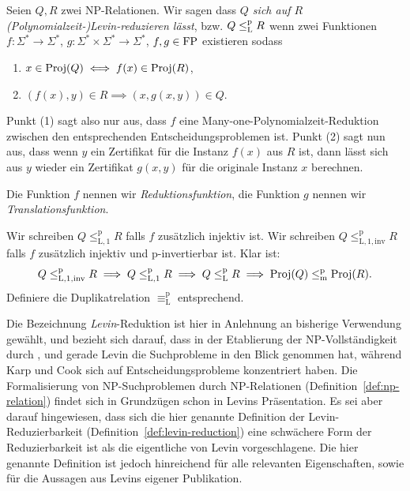 \begin{definition}\label{def:levin-reduction}
    Seien $Q, R$ zwei NP-Relationen. Wir sagen dass \emph{$Q$ sich auf $R$ (Polynomialzeit-)Levin-reduzieren lässt}, bzw. $Q\leq_\mathrm{L}^\mathrm{p} R$ wenn zwei Funktionen $f:\Sigma^*\to\Sigma^*$, $g:\Sigma^*\times\Sigma^*\to\Sigma^*$, $f, g\in \mathrm{FP}$ existieren sodass
    \begin{enumerate}
        \item $x\in\operatorname{Proj}(Q) \iff f(x)\in\operatorname{Proj}(R)$,
        \item $(f(x), y)\in R \implies (x, g(x,y))\in Q$.
    \end{enumerate}
    Punkt (1) sagt also nur aus, dass $f$ eine Many-one-Polynomialzeit-Reduktion zwischen den entsprechenden Entscheidungsproblemen ist.
    Punkt (2) sagt nun aus, dass wenn $y$ ein Zertifikat für die Instanz $f(x)$ aus $R$ ist, dann lässt sich aus $y$ wieder ein Zertifikat $g(x,y)$ für die originale Instanz $x$ berechnen.

    Die Funktion $f$ nennen wir \emph{Reduktionsfunktion}, die Funktion $g$ nennen wir \emph{Translationsfunktion}.

    Wir schreiben $Q\leq_\mathrm{L,1}^\mathrm p R$ falls $f$ zusätzlich injektiv ist. Wir schreiben $Q\leq_\mathrm{L,1,inv}^\mathrm p R$ falls $f$ zusätzlich injektiv und p-invertierbar ist. Klar ist:
    \[ Q\leq_\mathrm{L,1,inv}^\mathrm p R \implies Q \leq_\mathrm{L,1}^\mathrm p R \implies Q \leq_\mathrm{L}^\mathrm{p} R \implies \operatorname{Proj}(Q) \leq_\mathrm{m}^\mathrm{p} \operatorname{Proj}(R).\]
    Definiere die Duplikatrelation $\equiv_\mathrm L^\mathrm p$ entsprechend.
\end{definition}
Die Bezeichnung \emph{Levin}-Reduktion ist hier in Anlehnung an bisherige Verwendung gewählt, und bezieht sich darauf, dass in der Etablierung der NP-Vollständigkeit durch \textcite{karp_reducibility_1972}, \textcite{cook_complexity_1971} und \textcite{levin_universal_1973} gerade Levin die Suchprobleme in den Blick genommen hat, während Karp und Cook sich auf Entscheidungsprobleme konzentriert haben. Die Formalisierung von NP-Suchproblemen durch NP-Relationen (Definition~\ref{def:np-relation}) findet sich in Grundzügen schon in Levins Präsentation. Es sei aber darauf hingewiesen, dass sich die hier genannte Definition der Levin-Reduzierbarkeit (Definition~\ref{def:levin-reduction}) eine schwächere Form der Reduzierbarkeit ist als die eigentliche von Levin vorgeschlagene. Die hier genannte Definition ist jedoch hinreichend für alle relevanten Eigenschaften, sowie für die Aussagen aus Levins eigener Publikation.

